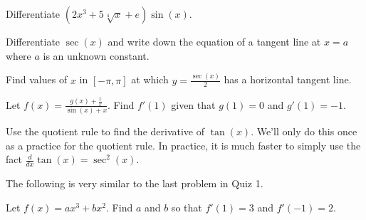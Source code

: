 \documentclass[../main.tex]{subfiles}
\begin{document}
\begin{example}
  Differentiate \((2x^{3} + 5 \sqrt[4]{x} + e)\sin(x)\).

  \blanks*
\end{example}
\clearpage

\begin{example}
  Differentiate \(\sec(x)\) and write down the equation of a tangent line at \(x = a\) where \(a\) is an unknown constant.

\end{example}

\begin{example} \label{ex:sec-horizontal-tangent}
  Find values of \(x\) in \([-\pi, \pi]\) at which \(y = \frac{\sec(x)}{2}\) has a horizontal tangent line.

  \blanks*
\end{example}
\clearpage

\begin{exercise} \label{ex:quotient-rule-abstract-g}
  Let \(f(x) = \frac{g(x) + \frac{1}{x}}{\sin(x) + x}\).  Find \(f'(1)\) given that \(g(1) = 0\) and \(g'(1) = -1\).

\end{exercise}

\begin{exercise}
  Use the quotient rule to find the derivative of \(\tan(x)\).  We'll only do this once as a practice for the quotient rule. In practice, it is much faster to simply use the fact \(\frac{d}{dx} \tan(x) = \sec^{2}(x)\).

  \blanks*
\end{exercise}
\clearpage


\begin{exercise} \label{ex:find-a-and-b-from-derivatives}
  The following is very similar to the last problem in Quiz 1.

  Let \(f(x) = ax^{3} + bx^{2}\). Find \(a\) and \(b\) so that \(f'(1) = 3\) and \(f'(-1) = 2\).

\end{exercise}
\end{document}
